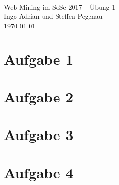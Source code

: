 \documentclass[a4paper,12pt]{article}
\begin{document}
\hfill \\
\begin{center}
{\Huge Web Mining im SoSe 2017 -- Übung 1} \\[0.5cm]
{\large Ingo Adrian und Steffen Pegenau} \\
{\large \today}
\end{center}

\section*{Aufgabe 1}

\section*{Aufgabe 2}

\section*{Aufgabe 3}

\section*{Aufgabe 4}

\end{document}
